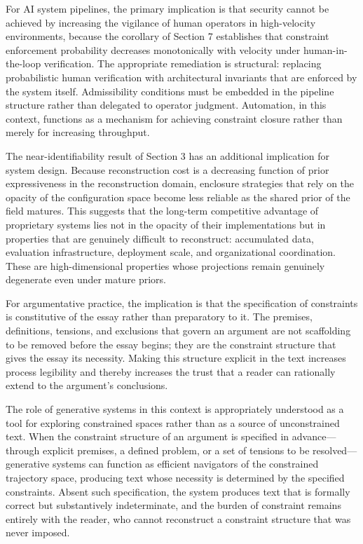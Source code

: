 \documentclass[12pt, oneside]{article}
\theoremstyle{plain}
\theoremstyle{definition}
\theoremstyle{remark}
\begin{document}
For AI system pipelines, the primary implication is that security cannot be achieved by
increasing the vigilance of human operators in high-velocity environments, because the
corollary of Section 7 establishes that constraint enforcement probability decreases
monotonically with velocity under human-in-the-loop verification. The appropriate
remediation is structural: replacing probabilistic human verification with architectural
invariants that are enforced by the system itself. Admissibility conditions must be embedded
in the pipeline structure rather than delegated to operator judgment. Automation, in this
context, functions as a mechanism for achieving constraint closure rather than merely for
increasing throughput.

The near-identifiability result of Section 3 has an additional implication for system design.
Because reconstruction cost is a decreasing function of prior expressiveness in the
reconstruction domain, enclosure strategies that rely on the opacity of the configuration
space become less reliable as the shared prior of the field matures. This suggests that the
long-term competitive advantage of proprietary systems lies not in the opacity of their
implementations but in properties that are genuinely difficult to reconstruct: accumulated
data, evaluation infrastructure, deployment scale, and organizational coordination. These
are high-dimensional properties whose projections remain genuinely degenerate even under
mature priors.

For argumentative practice, the implication is that the specification of constraints is
constitutive of the essay rather than preparatory to it. The premises, definitions, tensions,
and exclusions that govern an argument are not scaffolding to be removed before the essay
begins; they are the constraint structure that gives the essay its necessity. Making this
structure explicit in the text increases process legibility and thereby increases the trust
that a reader can rationally extend to the argument's conclusions.

The role of generative systems in this context is appropriately understood as a tool for
exploring constrained spaces rather than as a source of unconstrained text. When the
constraint structure of an argument is specified in advance---through explicit premises,
a defined problem, or a set of tensions to be resolved---generative systems can function
as efficient navigators of the constrained trajectory space, producing text whose necessity
is determined by the specified constraints. Absent such specification, the system produces
text that is formally correct but substantively indeterminate, and the burden of constraint
remains entirely with the reader, who cannot reconstruct a constraint structure that was
never imposed.
\end{document}
